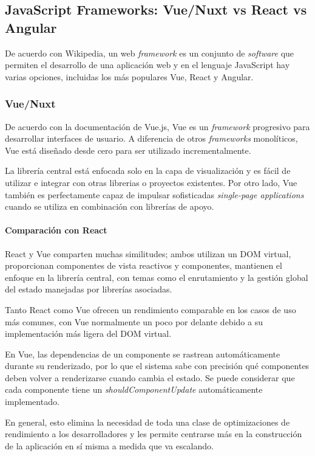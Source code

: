 \subsection{JavaScript Frameworks: Vue/Nuxt vs React vs Angular}

De acuerdo con Wikipedia\cite{noauthor_web_nodate}, un web \textit{framework} es un conjunto de \textit{software} que permiten el desarrollo de una aplicación web y en el lenguaje JavaScript hay varias opciones, incluidas los más populares Vue, React y Angular.

\subsubsection*{Vue/Nuxt}

De acuerdo con la documentación de Vue.js\cite{noauthor_que_nodate}, Vue es un \textit{framework} progresivo para desarrollar interfaces de usuario. A diferencia de otros \textit{frameworks} monolíticos, Vue está diseñado desde cero para ser utilizado incrementalmente.


La librería central está enfocada solo en la capa de visualización y es fácil de utilizar e integrar con otras librerias o proyectos existentes. Por otro lado, Vue también es perfectamente capaz de impulsar sofisticadas \textit{single-page applications} cuando se utiliza en combinación con librerías de apoyo.


\paragraph*{Comparación con React}

React y Vue comparten muchas similitudes; ambos utilizan un DOM virtual, proporcionan componentes de vista reactivos y componentes, mantienen el enfoque en la librería central, con temas como el enrutamiento y la gestión global del estado manejadas por librerías asociadas.


Tanto React como Vue ofrecen un rendimiento comparable en los casos de uso más comunes, con Vue normalmente un poco por delante debido a su implementación más ligera del DOM virtual.


En Vue, las dependencias de un componente se rastrean automáticamente durante su renderizado, por lo que el sistema sabe con precisión qué componentes deben volver a renderizarse cuando cambia el estado. Se puede considerar que cada componente tiene un \textit{shouldComponentUpdate} automáticamente implementado.


En general, esto elimina la necesidad de toda una clase de optimizaciones de rendimiento a los desarrolladores y les permite centrarse más en la construcción de la aplicación en sí misma a medida que va escalando.

